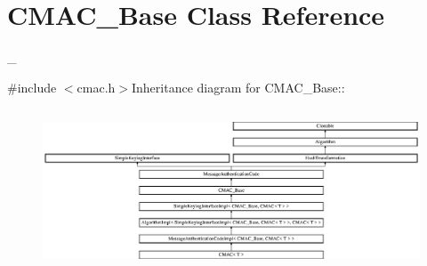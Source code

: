 \hypertarget{class_c_m_a_c___base}{
\section{CMAC\_\-Base Class Reference}
\label{class_c_m_a_c___base}
}


\_\-  


{\ttfamily \#include $<$cmac.h$>$}Inheritance diagram for CMAC\_\-Base::\begin{figure}[H]
\begin{center}
\leavevmode
\includegraphics[height=4.84615cm]{class_c_m_a_c___base}
\end{center}
\end{figure}
